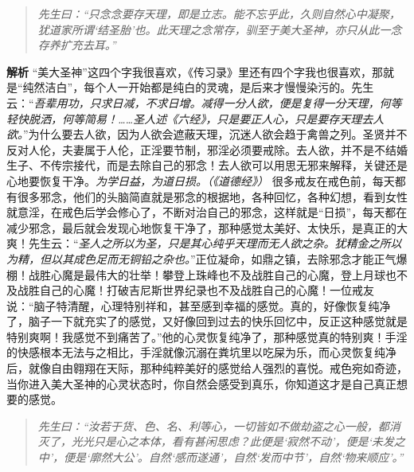 \begin{quote}\it
    先生曰：“只念念要存天理，即是立志。能不忘乎此，久则自然心中凝聚，犹道家所谓‘结圣胎’也。此天理之念常存，驯至于美大圣神，亦只从此一念存养扩充去耳。”
\end{quote}

\textbf{解析} “美大圣神”这四个字我很喜欢，《传习录》里还有四个字我也很喜欢，那就是“纯然洁白”，每个人一开始都是纯白的灵魂，是后来才慢慢染污的。先生云：“\textit{吾辈用功，只求日减，不求日增。减得一分人欲，便是复得一分天理，何等轻快脱洒，何等简易！……圣人述《六经》，只是要正人心，只是要存天理去人欲。}”为什么要去人欲，因为人欲会遮蔽天理，沉迷人欲会趋于禽兽之列。圣贤并不反对人伦，夫妻属于人伦，正淫要节制，邪淫必须要戒除。去人欲，并不是不结婚生子、不传宗接代，而是去除自己的邪念！去人欲可以用思无邪来解释，关键还是心地要恢复干净。\textit{为学日益，为道日损。（《道德经》）} 很多戒友在戒色前，每天都有很多邪念，他们的头脑简直就是邪念的根据地，各种回忆，各种幻想，看到女性就意淫，在戒色后学会修心了，不断对治自己的邪念，这样就是“日损”，每天都在减少邪念，最后就会发现心地恢复干净了，那种感觉太美好、太快乐，是真正的大爽！先生云：“\textit{圣人之所以为圣，只是其心纯乎天理而无人欲之杂。犹精金之所以为精，但以其成色足而无铜铅之杂也。}”正位凝命，如鼎之镇，去除邪念才能正气爆棚！战胜心魔是最伟大的壮举！攀登上珠峰也不及战胜自己的心魔，登上月球也不及战胜自己的心魔！打破吉尼斯世界纪录也不及战胜自己的心魔！一位戒友说：“脑子特清醒，心理特别祥和，甚至感到幸福的感觉。真的，好像恢复纯净了，脑子一下就充实了的感觉，又好像回到过去的快乐回忆中，反正这种感觉就是特别爽啊！我感觉不到痛苦了。”他的心灵恢复纯净了，那种感觉真的特别爽！手淫的快感根本无法与之相比，手淫就像沉溺在粪坑里以吃屎为乐，而心灵恢复纯净后，就像自由翱翔在天际，那种纯粹美好的感觉给人强烈的喜悦。戒色宛如奇迹，当你进入美大圣神的心灵状态时，你自然会感受到真乐，你知道这才是自己真正想要的感觉。

\begin{quote}\it
    先生曰：“汝若于货、色、名、利等心，一切皆如不做劫盗之心一般，都消灭了，光光只是心之本体，看有甚闲思虑？此便是‘寂然不动’，便是‘未发之中’，便是‘廓然大公’。自然‘感而遂通’，自然‘发而中节’，自然‘物来顺应’。”
\end{quote}

